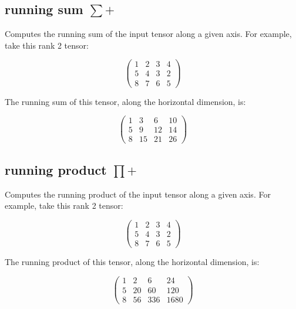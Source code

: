\subsection{running sum $\sum+$}\label{Operation:runningSum} Computes
the running sum of the input tensor along a given axis. For example,
take this rank 2 tensor:

\begin{displaymath}
  \left(
    \begin{array}{cccc}
      1& 2& 3& 4 \\
      5& 4& 3& 2 \\
      8& 7& 6& 5
    \end{array}
  \right)
\end{displaymath}

The running sum of this tensor, along the horizontal dimension, is:

\begin{displaymath}
  \left(
    \begin{array}{cccc}
      1& 3& 6& 10 \\
      5& 9& 12& 14 \\
      8& 15& 21& 26
    \end{array}
  \right)
\end{displaymath}

\subsection{running product $\prod+$}
\label{Operation:runningProduct} Computes the running product of the
input tensor along a given axis. For example, take this rank 2 tensor:

\begin{displaymath}
  \left(
    \begin{array}{cccc}
      1& 2& 3& 4\\ 
      5& 4& 3& 2\\ 
      8& 7& 6& 5 
    \end{array}
  \right)
\end{displaymath}

The running product of this tensor, along the horizontal dimension,
is:

\begin{displaymath}
  \left(
    \begin{array}{cccc}
      1& 2& 6& 24\\ 
      5& 20& 60& 120\\ 
      8& 56& 336& 1680 
    \end{array}
  \right)
\end{displaymath}

